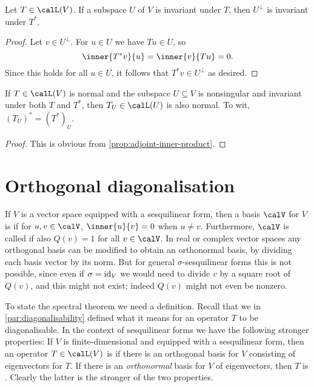 \begin{lemma}
    \label{lem:adjoint-invariant-subspace}
    Let $T \in \lin(V)$. If a subspace $U$ of $V$ is invariant under $T$, then $U^\perp$ is invariant under $T^*$.
\end{lemma}

\begin{proof}
    Let $v \in U^\perp$. For $u \in U$ we have $Tu \in U$, so
    \begin{equation*}
        \inner{T^*v}{u}
            = \inner{v}{Tu}
            = 0.
    \end{equation*}
    Since this holds for all $u \in U$, it follows that $T^*v \in U^\perp$ as desired.
\end{proof}


\begin{lemma}
    \label{lem:normal-operator-restriction-is-normal}
    If $T \in \lin(V)$ is normal and the subspace $U \subseteq V$ is nonsingular and invariant under both $T$ and $T^*$, then $T_U \in \lin(U)$ is also normal. To wit, $(T_U)^* = (T^*)_U$.
\end{lemma}

\begin{proof}
    This is obvious from \cref{prop:adjoint-inner-product}.
\end{proof}


\section{Orthogonal diagonalisation}

If $V$ is a vector space equipped with a sesquilinear form, then a basis $\calV$ for $V$ is  if for $u,v \in \calV$, $\inner{u}{v} = 0$ when $u \neq v$. Furthermore, $\calV$ is called  if also $Q(v) = 1$ for all $v \in \calV$. In real or complex vector spaces any orthogonal basis can be modified to obtain an orthonormal basis, by dividing each basis vector by its norm. But for general $\sigma$-sesquilinear forms this is not possible, since even if $\sigma = \operatorname{id}_V$ we would need to divide $v$ by a square root of $Q(v)$, and this might not exist; indeed $Q(v)$ might not even be nonzero.

To state the spectral theorem we need a definition. Recall that we in \cref{par:diagonalisability} defined what it means for an operator $T$ to be diagonalisable. In the context of sesquilinear forms we have the following stronger properties: If $V$ is finite-dimensional and equipped with a sesquilinear form, then an operator $T \in \lin(V)$ is  if there is an orthogonal basis for $V$ consisting of eigenvectors for $T$. If there is an \emph{orthonormal} basis for $V$ of eigenvectors, then $T$ is . Clearly the latter is the stronger of the two properties.

